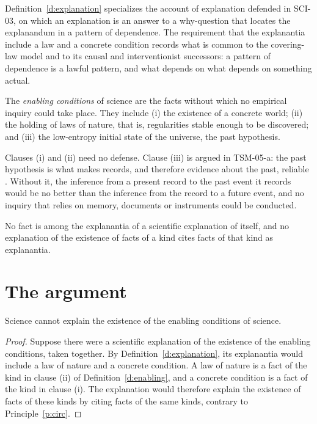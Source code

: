 \documentclass{situationist-preprint}
\begin{document}
Definition~\ref{d:explanation} specializes the account of explanation defended in SCI-03, on which an explanation is an answer to a why-question that locates the explanandum in a pattern of dependence. The requirement that the explanantia include a law and a concrete condition records what is common to the covering-law model \citep{HempelOppenheim1948} and to its causal and interventionist successors: a pattern of dependence is a lawful pattern, and what depends on what depends on something actual.

\begin{definition}\label{d:enabling}
The \emph{enabling conditions} of science are the facts without which no empirical inquiry could take place. They include (i) the existence of a concrete world; (ii) the holding of laws of nature, that is, regularities stable enough to be discovered; and (iii) the low-entropy initial state of the universe, the past hypothesis.
\end{definition}

Clauses (i) and (ii) need no defense. Clause (iii) is argued in TSM-05-a: the past hypothesis is what makes records, and therefore evidence about the past, reliable \citep{Albert2000}. Without it, the inference from a present record to the past event it records would be no better than the inference from the record to a future event, and no inquiry that relies on memory, documents or instruments could be conducted.

\begin{principle}\label{p:circ}
No fact is among the explanantia of a scientific explanation of itself, and no explanation of the existence of facts of a kind cites facts of that kind as explanantia.
\end{principle}

\section{The argument}

\begin{theorem}\label{t:limit}
Science cannot explain the existence of the enabling conditions of science.
\end{theorem}

\begin{proof}
Suppose there were a scientific explanation of the existence of the enabling conditions, taken together. By Definition~\ref{d:explanation}, its explanantia would include a law of nature and a concrete condition. A law of nature is a fact of the kind in clause (ii) of Definition~\ref{d:enabling}, and a concrete condition is a fact of the kind in clause (i). The explanation would therefore explain the existence of facts of these kinds by citing facts of the same kinds, contrary to Principle~\ref{p:circ}.
\end{proof}
\end{document}
